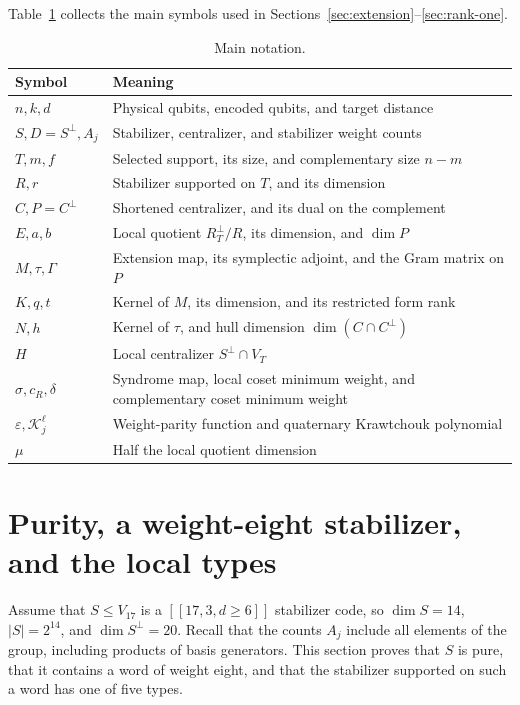 \documentclass[11pt]{article}
\theoremstyle{definition}
\theoremstyle{remark}
\newcommand{\qc}[1]{[\![#1]\!]}
\begin{document}
Table~\ref{tab:notation} collects the main symbols used in
Sections~\ref{sec:extension}--\ref{sec:rank-one}.

\begin{table}[htbp]
\centering\small
\caption{Main notation.}\label{tab:notation}
\begin{tabularx}{\linewidth}{@{}lX@{}}\toprule
Symbol&Meaning\\\midrule
\(n,k,d\)&Physical qubits, encoded qubits, and target distance\\
\(S,D=S^\perp,A_j\)&Stabilizer, centralizer, and stabilizer weight counts\\
\(T,m,f\)&Selected support, its size, and complementary size \(n-m\)\\
\(R,r\)&Stabilizer supported on \(T\), and its dimension\\
\(C,P=C^\perp\)&Shortened centralizer, and its dual on the complement\\
\(E,a,b\)&Local quotient \(R_T^\perp/R\), its dimension, and \(\dim P\)\\
\(M,\tau,\Gamma\)&Extension map, its symplectic adjoint, and the Gram matrix on \(P\)\\
\(K,q,t\)&Kernel of \(M\), its dimension, and its restricted form rank\\
\(N,h\)&Kernel of \(\tau\), and hull dimension \(\dim(C\cap C^\perp)\)\\
\(H\)&Local centralizer \(S^\perp\cap V_T\)\\
\(\sigma,c_R,\delta\)&Syndrome map, local coset minimum weight, and complementary coset minimum weight\\
\(\varepsilon,\mathcal{K}_j^\ell\)&Weight-parity function and quaternary Krawtchouk polynomial\\
\(\mu\)&Half the local quotient dimension\\\bottomrule
\end{tabularx}
\end{table}

\section{Purity, a weight-eight stabilizer, and the local types}\label{sec:forced}

Assume that \(S\leq V_{17}\) is a \(\qc{17,3,d\geq6}\)
stabilizer code, so \(\dim S=14\), \(|S|=2^{14}\), and \(\dim S^\perp=20\).
Recall that the counts \(A_j\) include all elements of the group,
including products of basis generators.
This section proves that \(S\) is pure, that it contains a word of
weight eight, and that the stabilizer supported on such a word has one
of five types.
\end{document}
